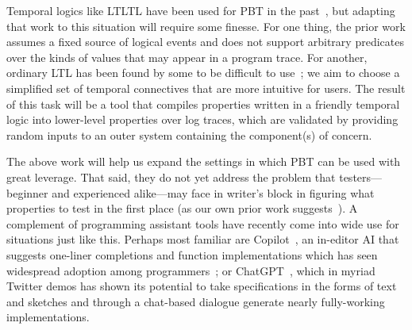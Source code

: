 Temporal logics like LTLTL have been used for PBT in the
past~\cite{oconnor_quickstrom_2022}, but adapting that work to this
situation will require some finesse. For one thing, the prior work
assumes a fixed source of logical events and does not
support arbitrary predicates over the kinds of values that may appear
in a program trace. For another, ordinary LTL has been found by some to be
difficult to use~\cite{greenman_little_2022}; we aim to choose a
simplified set of temporal connectives that are more intuitive for users.
%
The result of this task will be a tool that compiles properties written
in a friendly temporal logic into lower-level properties over log
traces, which are validated by providing random inputs to an outer
system {containing} the component(s) of concern.



%
The above work will help us expand the settings in which PBT can be used with
great leverage.  That said, they do not yet address the problem that
testers---beginner and experienced alike---may face in writer's block
in figuring what properties to test in the first place (as our own prior work suggests~\cite{goldstein_problems_2022}). A complement of
programming assistant tools have recently come into wide use for situations just
like this. Perhaps most familiar are
Copilot~\cite{tool:copilot}, an in-editor AI that suggests one-liner completions and
function implementations which has seen widespread adoption among programmers~\cite{ref:dohmke2022github}; or ChatGPT~\cite{tool:chatgpt}, which in
myriad Twitter demos has shown its potential to take specifications in the
forms of text and sketches and through a chat-based dialogue generate nearly
fully-working implementations.

